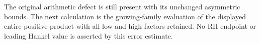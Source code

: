 The original arithmetic defect is still present with its
unchanged asymmetric bounds. The next calculation is the
growing-family evaluation of the displayed entire positive
product with all low and high factors retained. No RH endpoint
or leading Hankel value is asserted by this error estimate.